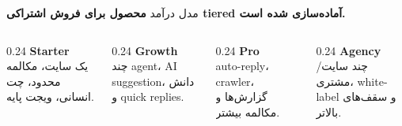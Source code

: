 \documentclass[aspectratio=169,12pt]{beamer}
\newcommand{\tagbox}[1]{\colorbox{soft}{\strut\hspace{1.2mm}{\small #1}\hspace{1.2mm}}}
\begin{document}
\begin{frame}{مدل درآمد}
  \textbf{محصول برای فروش اشتراکی tiered آماده‌سازی شده است.}

  \vspace{4mm}
  \begin{columns}[T,totalwidth=\textwidth]
    \begin{column}{0.24\textwidth}
      \textbf{Starter}\\
      {\small یک سایت، مکالمه محدود، چت انسانی، ویجت پایه.}
    \end{column}
    \begin{column}{0.24\textwidth}
      \textbf{Growth}\\
      {\small چند agent، AI suggestion، دانش و quick replies.}
    \end{column}
    \begin{column}{0.24\textwidth}
      \textbf{Pro}\\
      {\small auto-reply، crawler، گزارش‌ها و مکالمه بیشتر.}
    \end{column}
    \begin{column}{0.24\textwidth}
      \textbf{Agency}\\
      {\small چند سایت/مشتری، white-label و سقف‌های بالاتر.}
    \end{column}
  \end{columns}

  \vspace{2mm}
  \begin{center}
  \tagbox{Sites}\hspace{2mm}
  \tagbox{Agents}\hspace{2mm}
  \tagbox{Monthly Conversations}\hspace{2mm}
  \tagbox{AI Suggestions}\hspace{2mm}
  \tagbox{Auto Reply}\hspace{2mm}
  \tagbox{Crawler}
  \end{center}
\end{frame}
\end{document}
